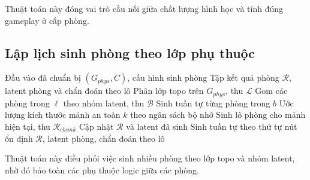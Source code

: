 \documentclass[oneside,a4paper,12pt]{extreport}
\begin{document}
Thuật toán này đóng vai trò cầu nối giữa chất lượng hình học và tính đúng gameplay ở cấp phòng.

\subsection{Lập lịch sinh phòng theo lớp phụ thuộc}
\begin{algorithm}[H]
\caption{Lập lịch sinh phòng theo lớp phụ thuộc}
\label{alg:app_layer_bucket_scheduler}
\begin{algorithmic}[1]
\Require Đầu vào đã chuẩn bị $(G_{phys}, C)$, cấu hình sinh phòng
\Ensure Tập kết quả phòng $\mathcal{R}$, latent phòng và chẩn đoán theo lô
  \State Phân lớp topo trên $G_{phys}$, thu $\mathcal{L}$
    \State Gom các phòng trong $\ell$ theo nhóm latent, thu $\mathcal{B}$
        \State Sinh tuần tự từng phòng trong $b$
      \Else
        \State Ước lượng kích thước mảnh an toàn $k$ theo ngân sách bộ nhớ
          \State Sinh lô phòng cho mảnh hiện tại, thu $\mathcal{R}_{chunk}$
          \State Cập nhật $\mathcal{R}$ và latent đã sinh
        \EndFor
      \EndIf
    \EndFor
  \EndFor
\Else
  \State Sinh tuần tự theo thứ tự nút ổn định
\EndIf
\State \Return $\mathcal{R}$, latent phòng, chẩn đoán theo lô
\end{algorithmic}
\end{algorithm}

Thuật toán này điều phối việc sinh nhiều phòng theo lớp topo và nhóm latent, nhờ đó bảo toàn các phụ thuộc logic giữa các phòng.
\end{document}
